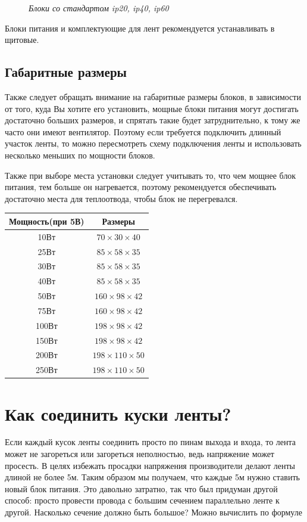 \documentclass[a4paper, 12pt]{article}
\newcommand{\image}[3]{\begin{figure}[h!]\center{\texttt{[image: \#1]} }\caption{\textit{#3}}\end{figure}}
\begin{document}
\image{ip_блоки_питания.png}{130}{Блоки со стандартом ip20, ip40, ip60}

Блоки питания и комплектующие для лент рекомендуется устанавливать в щитовые.

\subsection{Габаритные размеры}

Также следует обращать внимание на габаритные размеры блоков, в зависимости от 
того, куда Вы хотите его установить, мощные блоки питания могут достигать 
достаточно больших размеров, и спрятать такие будет затруднительно, к тому же 
часто они имеют вентилятор. Поэтому если требуется подключить длинный участок 
ленты, то можно пересмотреть схему подключения ленты и использовать несколько 
меньших по мощности блоков.

Также при выборе места установки следует учитывать то, что чем мощнее блок 
питания, тем больше он нагревается, поэтому рекомендуется обеспечивать 
достаточно места для теплоотвода, чтобы блок не перегревался.

\begin{table}[H]
    \begin{center}
    \begin{tabular}{|c|c|}
    \hline
    Мощность(при 5В) & Размеры \\
    \hline
    10Вт  &  $70  \times  30 \times 40$ \\
    25Вт  &  $85  \times  58 \times 35$ \\
    30Вт  &  $85  \times  58 \times 35$ \\
    40Вт  &  $85  \times  58 \times 35$ \\
    50Вт  &  $160 \times  98 \times 42$ \\
    75Вт  &  $160 \times  98 \times 42$ \\
    100Вт &  $198 \times  98 \times 42$ \\
    150Вт &  $198 \times  98 \times 42$ \\
    200Вт &  $198 \times 110 \times 50$ \\
    250Вт &  $198 \times 110 \times 50$ \\
    \hline
    \end{tabular}
    \end{center}
\end{table}

\section{Как соединить куски ленты?}
Если каждый кусок ленты соединить просто по пинам выхода и входа, то лента 
может не загореться или загореться неполностью, ведь напряжение может просесть.
В целях избежать просадки напряжения производители делают ленты длиной не 
более 5м. Таким образом мы получаем, что каждые 5м нужно ставить новый блок 
питания. Это давольно затратно, так что был придуман другой способ: просто 
провести провода с большим сечением параллельно ленте к другой. Насколько 
сечение должно быть большое? Можно вычислить по формуле 
\end{document}
